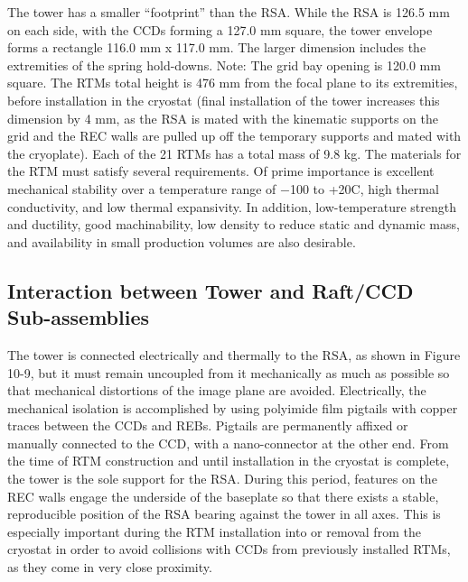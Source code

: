 The tower has a smaller “footprint” than the RSA. While the RSA is 126.5 mm on each side, with the CCDs forming a 127.0 mm square, the tower envelope forms a rectangle 116.0 mm x 117.0 mm. The larger dimension includes the extremities of the spring hold-downs. Note: The grid bay opening is 120.0 mm square. The RTMs total height is 476 mm from the focal plane to its extremities, before installation in the cryostat (final installation of the tower increases this dimension by 4 mm, as the RSA is mated with the kinematic supports on the grid and the REC walls are pulled up off the temporary supports and mated with the cryoplate). Each of the 21 RTMs has a total mass of 9.8 kg.
The materials for the RTM must satisfy several requirements. Of prime importance is excellent mechanical stability over a temperature range of $-$100 to  +20\degsym C, high thermal conductivity, and low thermal expansivity. In addition, low-temperature strength and ductility, good machinability, low density to reduce static and dynamic mass, and availability in small production volumes are also desirable.

\subsection{Interaction between Tower and Raft/CCD Sub-assemblies}
The tower is connected electrically and thermally to the RSA, as shown in Figure 10-9, but it must remain uncoupled from it mechanically as much as possible so that mechanical distortions of the image plane are avoided. Electrically, the mechanical isolation is accomplished by using polyimide film pigtails with copper traces between the CCDs and REBs. Pigtails are permanently affixed or manually connected to the CCD, with a nano-connector at the other end. 
From the time of RTM construction and until installation in the cryostat is complete, the tower is the sole support for the RSA. During this period, features on the REC walls engage the underside of the baseplate so that there exists a stable, reproducible position of the RSA bearing against the tower in all axes. This is especially important during the RTM installation into or removal from the cryostat in order to avoid collisions with CCDs from previously installed RTMs, as they come in very close proximity.

